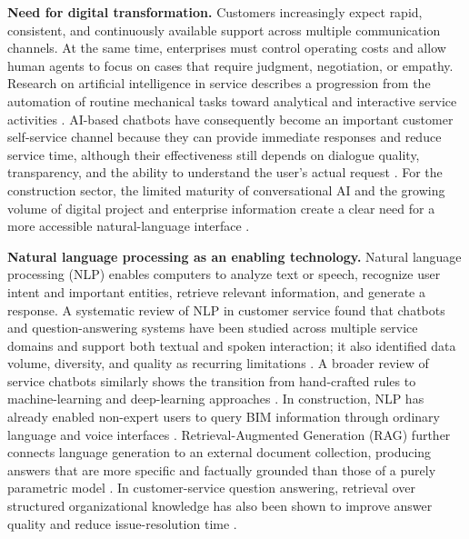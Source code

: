 \documentclass[11pt,a4paper]{article}
\begin{document}
\textbf{Need for digital transformation.}
Customers increasingly expect rapid, consistent, and continuously available
support across multiple communication channels. At the same time, enterprises
must control operating costs and allow human agents to focus on cases that
require judgment, negotiation, or empathy. Research on artificial intelligence
in service describes a progression from the automation of routine mechanical
tasks toward analytical and interactive service activities \cite{huang2018}.
AI-based chatbots have consequently become an important customer self-service
channel because they can provide immediate responses and reduce service time,
although their effectiveness still depends on dialogue quality, transparency,
and the ability to understand the user's actual request \cite{adam2021}. For the
construction sector, the limited maturity of conversational AI and the growing
volume of digital project and enterprise information create a clear need for a
more accessible natural-language interface \cite{saka2023}.

\textbf{Natural language processing as an enabling technology.}
Natural language processing (NLP) enables computers to analyze text or speech,
recognize user intent and important entities, retrieve relevant information,
and generate a response. A systematic review of NLP in customer service found
that chatbots and question-answering systems have been studied across multiple
service domains and support both textual and spoken interaction; it also
identified data volume, diversity, and quality as recurring limitations
\cite{mashaabi2022}. A broader review of service chatbots similarly shows the
transition from hand-crafted rules to machine-learning and deep-learning
approaches \cite{suhaili2021}. In construction, NLP has already enabled
non-expert users to query BIM information through ordinary language and voice
interfaces \cite{nabavi2023}. Retrieval-Augmented Generation (RAG) further
connects language generation to an external document collection, producing
answers that are more specific and factually grounded than those of a purely
parametric model \cite{lewis2020}. In customer-service question answering,
retrieval over structured organizational knowledge has also been shown to
improve answer quality and reduce issue-resolution time \cite{xu2024}.
\end{document}

